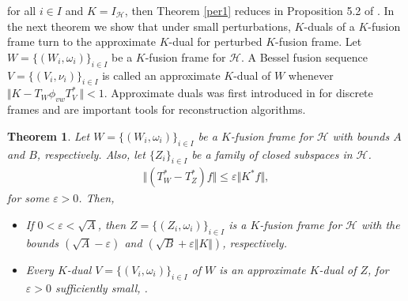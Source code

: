 \documentclass{birkjour}
\newtheorem{thm}{Theorem}[section]
\theoremstyle{definition}
\theoremstyle{remark}
\numberwithin{equation}{section}
\begin{document}
for all $i\in I$ and $K=I_{\mathcal{H}}$, then Theorem \ref{per1} reduces  in
Proposition 5.2 of \cite{Cas08}. In the next theorem we show that under  small perturbations, $K$-duals of a $K$-fusion frame turn to the  approximate $K$-dual for perturbed $K$-fusion frame. Let  $W=\lbrace
(W_{i},\omega_{i})\rbrace_{i\in I}$ be a $K$-fusion frame for $\mathcal{H}$.  A Bessel fusion sequence $V=\lbrace(V_{i},\nu_{i})\rbrace_{i\in I}$ is called  an approximate $K$-dual of  $W$ whenever $\Vert K -  T_{W}\phi_{vw}T^{*}_{V}\  \Vert<1$.
 Approximate duals  was first  introduced in \cite{app.} for discrete frames and
are  important tools for reconstruction algorithms.

\begin{thm}\label{last} Let $W=\lbrace
(W_{i},\omega_{i})\rbrace_{i\in I}$ be a $K$-fusion frame for $\mathcal{H}$
with bounds $A$ and $B$, respectively. Also, let $\{Z_{i}\}_{i\in I}$ be a family of closed subspaces in $\mathcal{H}$.
 \begin{eqnarray*} \Vert
(T^{*}_{W}-T^{*}_{Z})f\Vert \leq \varepsilon \Vert K^{*}f\Vert, \end{eqnarray*}
for some   $\varepsilon> 0$. Then,
\begin{itemize}
\item[(i)]
If $0 < \varepsilon < \sqrt{A}$, then $Z = \lbrace
(Z_{i},\omega_{i})\rbrace_{i\in I}$ is a $K$-fusion frame for $\mathcal{H}$ with the bounds $(\sqrt{A}-\varepsilon)$ and
$(\sqrt{B} + \varepsilon \Vert K\Vert)$, respectively.
\item[(ii)]
Every $K$-dual $V=\lbrace(V_{i},\omega_{i})\rbrace_{i\in I}$ of $W$ is an approximate $K$-dual of  $Z$, for  $\varepsilon> 0$  sufficiently small, .
\end{itemize}
 \end{thm}
\end{document}

